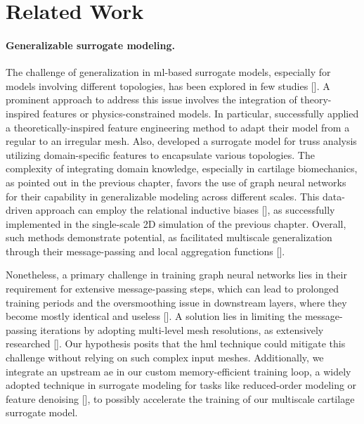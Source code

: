 \section{Related Work}
%
\paragraph{Generalizable surrogate modeling.} The challenge of generalization in \ac{ml}-based surrogate models, especially for models involving different topologies, has been explored in few studies [\cite{hoffer2022,taghizadeh2020}]. A prominent approach to address this issue involves the integration of theory-inspired features or physics-constrained models. In particular, \cite{gao2021} successfully applied a theoretically-inspired feature engineering method to adapt their model from a regular to an irregular mesh. Also, \cite{nourbakhsh2018} developed a surrogate model for truss analysis utilizing domain-specific features to encapsulate various topologies. The complexity of integrating domain knowledge, especially in cartilage biomechanics, as pointed out in the previous chapter, favors the use of graph neural networks for their capability in generalizable modeling across different scales. This data-driven approach can employ the relational inductive biases [\cite{battaglia2018}], as successfully implemented in the single-scale 2D simulation of the previous chapter. Overall, such methods demonstrate potential, as facilitated multiscale generalization through their message-passing and local aggregation functions [\cite{battaglia2018,sanchez2020}].

Nonetheless, a primary challenge in training graph neural networks lies in their requirement for extensive message-passing steps, which can lead to prolonged training periods and the oversmoothing issue in downstream layers, where they become mostly identical and useless [\cite{zhang2024}]. A solution lies in limiting the message-passing iterations by adopting multi-level mesh resolutions, as extensively researched [\cite{cao2023,fortunato2022,li2020}]. Our hypothesis posits that the \ac{hml} technique could mitigate this challenge without relying on such complex input meshes. Additionally, we integrate an upstream \ac{ae} in our custom memory-efficient training loop, a widely adopted technique in surrogate modeling for tasks like reduced-order modeling or feature denoising [\cite{fresca2022,pant2021,fresca2021}], to possibly accelerate the training of our multiscale cartilage surrogate model.


